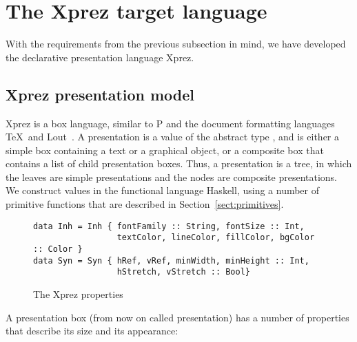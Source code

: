 %																
%																
%																
\section{The {\sc Xprez} target language} \label{sect:xpreztarget}

With the requirements from the previous subsection in mind, we have developed the declarative presentation language {\sc Xprez}. 

%																
\subsection{{\sc Xprez} presentation model}

{\sc Xprez} is a box language, similar to P and the document formatting languages \TeX ~and Lout~\cite{kingston93lout}. A presentation is a value of the abstract type , and is either a simple box containing a text or a graphical object, or a composite box that contains a list of child presentation boxes. Thus, a presentation is a tree, in which the leaves are simple presentations and the nodes are composite presentations. We construct  values in the functional language Haskell, using a number of primitive functions that are described in Section~\ref{sect:primitives}.

\begin{figure}
\begin{small}
\begin{center}
\begin{small}
\begin{verbatim}
data Inh = Inh { fontFamily :: String, fontSize :: Int,
                 textColor, lineColor, fillColor, bgColor :: Color } 
data Syn = Syn { hRef, vRef, minWidth, minHeight :: Int,
                 hStretch, vStretch :: Bool}
\end{verbatim}
\end{small}
\caption{The {\sc Xprez} properties}\label{xprezproperties} 
\end{center}
\end{small}
\end{figure}


A presentation box (from now on called presentation) has a number of properties that describe its size and its appearance: 

\begin{center}
\end{center}

